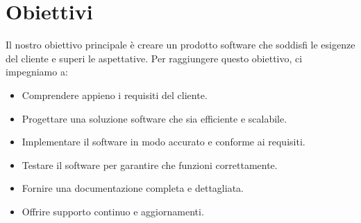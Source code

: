 \documentclass{article}
\begin{document}
\section{Obiettivi}
\label{sec:obiettivi}
Il nostro obiettivo principale è creare un prodotto software che soddisfi le esigenze del cliente e superi le aspettative. Per raggiungere questo obiettivo, ci impegniamo a:
\begin{itemize}
    \item Comprendere appieno i requisiti del cliente.
    \item Progettare una soluzione software che sia efficiente e scalabile.
    \item Implementare il software in modo accurato e conforme ai requisiti.
    \item Testare il software per garantire che funzioni correttamente.
    \item Fornire una documentazione completa e dettagliata.
    \item Offrire supporto continuo e aggiornamenti.
\end{itemize}
\end{document}
